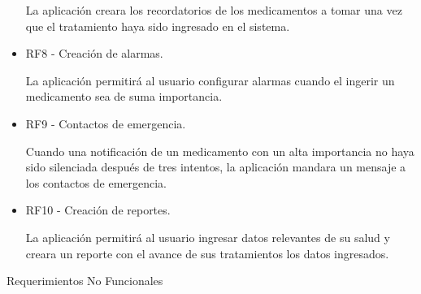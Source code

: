 \begin{itemize}
	La aplicación creara los recordatorios de los medicamentos a tomar  una vez que el tratamiento haya sido ingresado en el sistema.
	
	\item RF8 - Creación de alarmas.
	
	La aplicación permitirá al usuario configurar alarmas cuando el ingerir un medicamento sea de suma importancia.
	
	\item RF9 - Contactos de emergencia.
	
	Cuando una notificación de un medicamento con un alta importancia no haya sido silenciada después de tres intentos, la aplicación mandara un mensaje a los contactos de emergencia.
	
	\item RF10 - Creación de reportes.
	
	La aplicación permitirá al usuario ingresar datos relevantes de su salud y creara un reporte con el avance de sus tratamientos los datos ingresados.
	
	
	
	
	
	
\end{itemize}
Requerimientos No Funcionales


%
%
%
%

